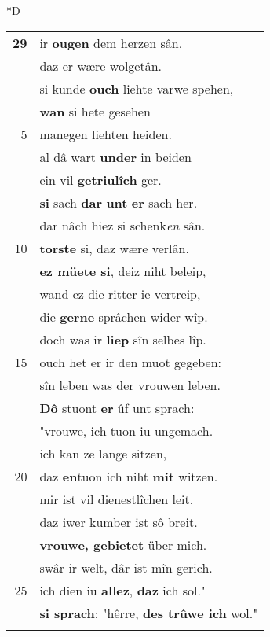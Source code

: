 \documentclass[8pt,a4paper,notitlepage]{article}
\begin{document}
\begin{table}[ht]
\begin{minipage}[t]{0.5\linewidth}
\small
\begin{center}*D
\end{center}
\begin{tabular}{rl}
\textbf{29} & ir \textbf{ougen} dem herzen sân,\\ 
 & daz er wære wolgetân.\\ 
 & si kunde \textbf{ouch} liehte varwe spehen,\\ 
 & \textbf{wan} si hete gesehen\\ 
5 & manegen liehten heiden.\\ 
 & al dâ wart \textbf{under} in beiden\\ 
 & ein vil \textbf{getriulîch} ger.\\ 
 & \textbf{si} sach \textbf{dar} \textbf{unt} \textbf{er} sach her.\\ 
 & dar nâch hiez si schenk\textit{en} sân.\\ 
10 & \textbf{torste} si, daz wære verlân.\\ 
 & \textbf{ez müete si}, deiz niht beleip,\\ 
 & wand ez die ritter ie vertreip,\\ 
 & die \textbf{gerne} sprâchen wider wîp.\\ 
 & doch was ir \textbf{liep} sîn selbes lîp.\\ 
15 & ouch het er ir den muot gegeben:\\ 
 & sîn leben was der vrouwen leben.\\ 
 & \textbf{Dô} stuont \textbf{er} ûf unt sprach:\\ 
 & "vrouwe, ich tuon iu ungemach.\\ 
 & ich kan ze lange sitzen,\\ 
20 & daz \textbf{en}tuon ich niht \textbf{mit} witzen.\\ 
 & mir ist vil dienestlîchen leit,\\ 
 & daz iwer kumber ist sô breit.\\ 
 & \textbf{vrouwe, gebietet} über mich.\\ 
 & swâr ir welt, dâr ist mîn gerich.\\ 
25 & ich dien iu \textbf{allez}, \textbf{daz} ich sol."\\ 
 & \textbf{si sprach}: "hêrre, \textbf{des trûwe ich} wol."\\ 
 & \textit{\begin{large}D\end{large}}er burcgrâve, sîn wir\textit{t},\\ 

\end{tabular}
\end{minipage}
\end{table}
\end{document}
